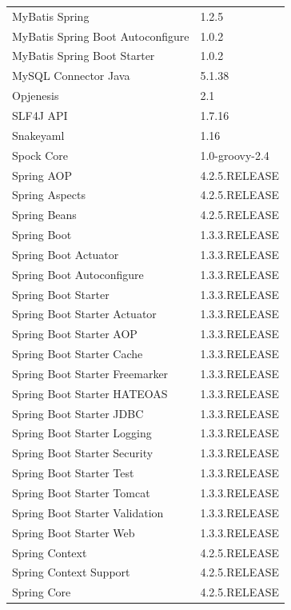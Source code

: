 \documentclass[12pt]{scrreprt}
\begin{document}
\begin{longtable}{ l | l }
				MyBatis Spring						& 1.2.5				\\
				MyBatis Spring Boot Autoconfigure	& 1.0.2				\\
				MyBatis Spring Boot Starter			& 1.0.2				\\
				MySQL Connector Java				& 5.1.38			\\
				Opjenesis							& 2.1				\\
				SLF4J API							& 1.7.16			\\
				Snakeyaml							& 1.16				\\
				Spock Core							& 1.0-groovy-2.4	\\
				Spring AOP							& 4.2.5.RELEASE		\\
				Spring Aspects						& 4.2.5.RELEASE		\\
				Spring Beans						& 4.2.5.RELEASE		\\
				Spring Boot							& 1.3.3.RELEASE		\\
				Spring Boot Actuator				& 1.3.3.RELEASE		\\
				Spring Boot Autoconfigure			& 1.3.3.RELEASE		\\
				Spring Boot Starter					& 1.3.3.RELEASE		\\
				Spring Boot Starter Actuator		& 1.3.3.RELEASE		\\
				Spring Boot Starter AOP				& 1.3.3.RELEASE		\\
				Spring Boot Starter Cache			& 1.3.3.RELEASE		\\
				Spring Boot Starter Freemarker		& 1.3.3.RELEASE		\\
				Spring Boot Starter HATEOAS			& 1.3.3.RELEASE		\\
				Spring Boot Starter JDBC			& 1.3.3.RELEASE		\\
				Spring Boot Starter Logging			& 1.3.3.RELEASE		\\
				Spring Boot Starter Security		& 1.3.3.RELEASE		\\
				Spring Boot Starter Test			& 1.3.3.RELEASE		\\
				Spring Boot Starter Tomcat			& 1.3.3.RELEASE		\\
				Spring Boot Starter Validation		& 1.3.3.RELEASE		\\
				Spring Boot Starter Web				& 1.3.3.RELEASE		\\
				Spring Context						& 4.2.5.RELEASE		\\
				Spring Context Support				& 4.2.5.RELEASE		\\
				Spring Core							& 4.2.5.RELEASE		\\

\end{longtable}
\end{document}
